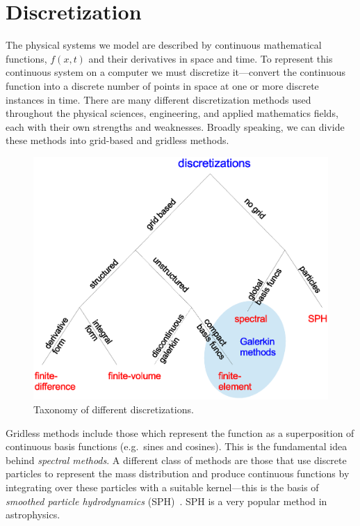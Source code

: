 \section{Discretization}

The physical systems we model are described by continuous mathematical
functions, $f(x,t)$ and their derivatives in space and time.  To
represent this continuous system on a computer we must discretize
it---convert the continuous function into a discrete number of points
in space at one or more discrete instances in time.
There are many different discretization methods used throughout the
physical sciences, engineering, and applied mathematics fields, each
with their own strengths and weaknesses.  Broadly speaking, we can
divide these methods into grid-based and gridless methods.

\begin{figure}[h]
\centering
\includegraphics[width=\linewidth]{discretizations}
\caption[Taxonomy of different discretizations]
   {\label{fig:disc} Taxonomy of different discretizations.}
\end{figure}

Gridless methods include those which represent the function as a
superposition of continuous basis functions (e.g.\ sines and cosines).
This is the fundamental idea behind {\em spectral methods}.  A different
class of methods are those that use discrete particles to represent the
mass distribution and produce continuous functions by integrating
over these particles with a suitable kernel---this is the basis of
{\em smoothed particle hydrodynamics} (SPH)~\cite{SPH}.  SPH is a very popular
method in astrophysics.

